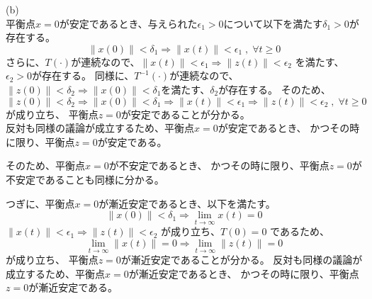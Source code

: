 \documentclass{jsarticle}
\begin{document}
(b)\\
平衡点$x=0$が安定であるとき、与えられた$\epsilon_1>0$について以下を満たす$\delta_1>0$が存在する。
\begin{equation*}
  \|x(0)\|< \delta_1 \Rightarrow \|x(t)\| < \epsilon_1\;,\;\forall t\geq 0
\end{equation*}
さらに、$T(\cdot)$が連続なので、$\|x(t)\|<\epsilon_1 \Rightarrow \|z(t)\| < \epsilon_2 $
を満たす、$\epsilon_2>0$が存在する。
同様に、$T^{-1}(\cdot)$が連続なので、$ \|z(0)\| < \delta_2 \Rightarrow \|x(0)\|<\delta_1$を満たす、$\delta_2$が存在する。
そのため、
\begin{equation*}
  \|z(0)\| < \delta_2 \Rightarrow \|x(0)\|<\delta_1
  \Rightarrow \|x(t)\| < \epsilon_1
  \Rightarrow \|z(t)\| < \epsilon_2 \;,\;\forall t\geq 0
\end{equation*}
が成り立ち、
平衡点$z=0$が安定であることが分かる。\\
反対も同様の議論が成立するため、平衡点$x=0$が安定であるとき、
かつその時に限り、平衡点$z=0$が安定である。

そのため、平衡点$x=0$が不安定であるとき、
かつその時に限り、平衡点$z=0$が不安定であることも同様に分かる。

つぎに、平衡点$x=0$が漸近安定であるとき、以下を満たす。
\begin{equation*}
  \|x(0)\|< \delta_1 \Rightarrow \lim_{t\rightarrow \infty}x(t) = 0
\end{equation*}
$\|x(t)\|<\epsilon_1 \Rightarrow \|z(t)\| < \epsilon_2 $
が成り立ち、$T ( 0 ) = 0$ であるため、
\begin{equation*}
  \lim_{t\rightarrow \infty}\|x(t)\| = 0 \Rightarrow \lim_{t\rightarrow \infty}\|z(t)\| = 0
\end{equation*}
が成り立ち、
平衡点$z=0$が漸近安定であることが分かる。
反対も同様の議論が成立するため、平衡点$x=0$が漸近安定であるとき、
かつその時に限り、平衡点$z=0$が漸近安定である。
\end{document}

